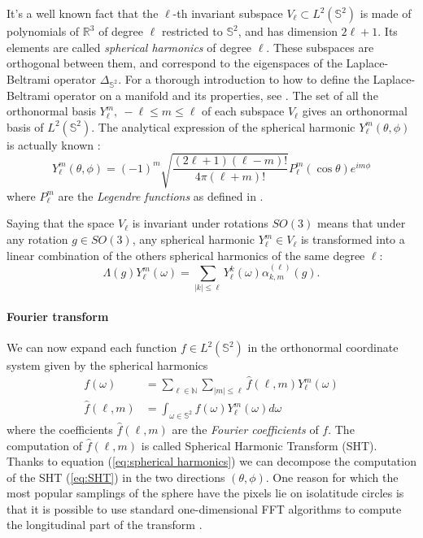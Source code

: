 It's a well known fact \cite{Driscoll:1994:CFT:184069.184073} that the $\ell$-th invariant subspace $V_\ell\subset L^2(\mathbb S^2)$ is made of polynomials of $\mathbb R^3$ of degree $\ell$ restricted to $\mathbb S^2$, and has dimension $2\ell+1$. Its elements are called \textit{spherical harmonics} of degree $\ell$. These subspaces are orthogonal between them, and correspond to the eigenspaces of the Laplace-Beltrami operator $\Delta_{\mathbb S^2}$. For a thorough introduction to how to define the Laplace-Beltrami operator on a manifold and its properties, see \cite{rosenberg_1997}. The set of all the orthonormal basis $Y_\ell^m,\ -\ell\leq m\leq\ell$ of each subspace $V_\ell$ gives an orthonormal basis of $L^2(\mathbb S^2)$. The analytical expression of the spherical harmonic $Y_\ell^m(\theta, \phi)$ is actually known \cite{Driscoll:1994:CFT:184069.184073}:
\begin{equation}\label{eq:spherical harmonics}
	Y_\ell^m(\theta, \phi) = (-1)^{m} \sqrt{\frac{(2 \ell+1)(\ell-m) !}{4 \pi(\ell+m) !}} P_{\ell}^{m}(\cos \theta) e^{i m \phi}
\end{equation}
where $P_{\ell}^{m}$ are the \textit{Legendre functions} as defined in \cite{Driscoll:1994:CFT:184069.184073}. 
\vspace{0.5cm}
\begin{remark}
	Saying that the space $V_\ell$ is invariant under rotations $SO(3)$ means that under any rotation $g\in SO(3)$, any spherical harmonic $Y_\ell^m\in V_\ell$ is transformed into a linear combination of the others spherical harmonics of the same degree $\ell$:
	$$
	\Lambda(g) Y_{\ell}^{m}(\omega)=\sum_{|k| \leq \ell} Y_{\ell}^{k}(\omega) \alpha_{k, m}^{(\ell)}(g).
	$$
\end{remark}
\vspace{0.5cm}

\paragraph{Fourier transform}
We can now expand each function $f\in L^2(\mathbb S^2)$ in the orthonormal coordinate system given by the spherical harmonics 
\begin{align}\label{eq:inverse spherical fourier transform}
	f(\omega) &= \sum_{\ell\in\mathbb N}\sum_{|m|\leq \ell}\hat f(\ell,m) Y_\ell^m(\omega)\\
	\hat f(\ell,m) &=\int_{\omega\in\mathbb S^2}f(\omega)Y_\ell^m(\omega)d\omega \label{eq:SHT}
\end{align}
where the coefficients $\hat f(\ell,m)$ are the \textit{Fourier coefficients} of $f$. The computation of $\hat f(\ell, m)$ is called Spherical Harmonic Transform (SHT). Thanks to equation (\ref{eq:spherical harmonics}) we can decompose the computation of the SHT (\ref{eq:SHT}) in the two directions $(\theta, \phi)$. One reason for which the most popular samplings of the sphere have the pixels lie on isolatitude circles is that it is possible to use standard one-dimensional FFT algorithms to compute the longitudinal part of the transform \cite{HEALPix}.

